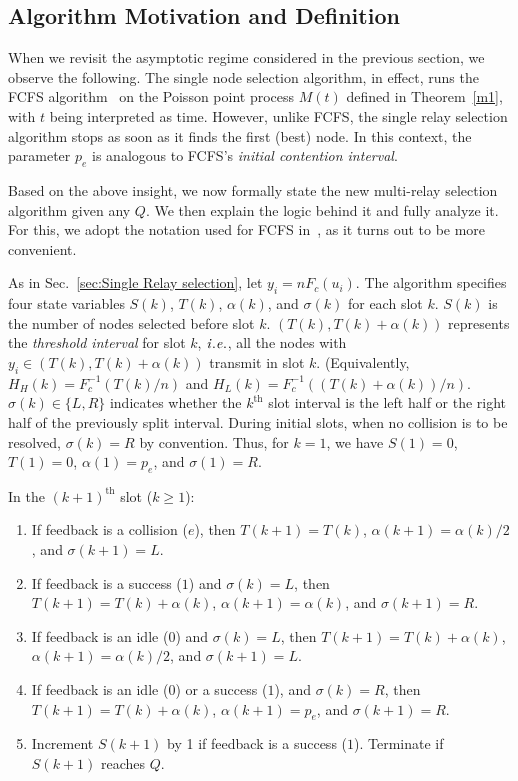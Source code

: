 \documentclass[12pt,draftcls,peerreview, onecolumn]{IEEEtran}
\newcommand{\brac}[1]{\left({#1}\right)}
\newcommand{\kth}{^{{\mathrm{th}}}}
\newcommand{\ie}{{\it i.e.}}
\begin{document}
\subsection{Algorithm Motivation and Definition}
\label{subsec:Q-algo defiition}

When we revisit the asymptotic regime considered in the previous
section, we observe the following.  The single node selection
algorithm, in effect, runs the FCFS
algorithm~\cite{bertsekas_gallager} on the Poisson point process
$M(t)$ defined in Theorem~\ref{m1}, with $t$ being interpreted as
time.  However, unlike FCFS, the single relay selection algorithm
stops as soon as it finds the first (best) node.  In this context, the
parameter $p_e$ is analogous to FCFS's {\em initial contention
  interval}.


Based on the above insight, we now formally state the new multi-relay
selection algorithm given any $Q$. We then explain the logic behind it
and fully analyze it.  For this, we adopt the notation used for FCFS
in~\cite{bertsekas_gallager}, as it turns out to be more convenient.

As in Sec.~\ref{sec:Single Relay selection}, let $y_{i} = n F_c(u_i)$.
The algorithm specifies four state variables $S(k)$, $T(k)$,
$\alpha(k)$, and $\sigma(k)$ for each slot $k$. $S(k)$ is the number
of nodes selected before slot $k$.  $(T(k), T(k)+\alpha(k))$
represents the {\em threshold interval} for slot $k$, $\ie$, all the
nodes with $y_i\in(T(k), T(k)+\alpha(k))$ transmit in slot $k$.
(Equivalently, $H_H(k)=F_c^{-1}\brac{T(k)/n}$ and \mbox{$H_L(k)=
  F_c^{-1}\brac{ \brac{ T(k) + \alpha(k)}/n}$.}
$\sigma(k)\in\{L,R\}$ indicates whether the $k\kth$ slot interval is
the left half or the right half of the previously split interval.
During initial slots, when no collision is to be resolved,
$\sigma(k)=R$ by convention. Thus, for $k = 1$, we have
$S(1) = 0$, $T(1) = 0$, $\alpha(1)=p_e$, and $\sigma(1) = R$.


In the $(k+1)\kth$ slot ($k \geq 1$):
\begin{enumerate}
\item If feedback is a collision ($e$), then $T(k+1) = T(k) $, \mbox{$\alpha(k+1) = \alpha(k)/2$,} and $\sigma(k+1) = L$.

\item If feedback is a success ($1$) and $\sigma(k) = L$, then \mbox{$T(k+1) = T(k) + \alpha(k)$}, $\alpha(k+1) = \alpha(k)$,
and \mbox{$\sigma(k+1) = R$. }

\item If feedback is an idle ($0$) and $\sigma(k) = L$, then \mbox{$T(k+1) = T(k) +\alpha(k)$,} $\alpha(k+1) = \alpha(k)/2$, and $\sigma(k+1) = L$.

\item If feedback is an idle ($0$) or a success ($1$), and $\sigma(k) = R$, then $ T(k+1) = T(k)+\alpha(k)$, $\alpha(k+1) = p_{e}$, and $\sigma(k+1) = R$.

\item Increment $S(k+1)$ by 1 if feedback is a success ($1$). Terminate if $S(k+1)$ reaches $Q$.
\end{enumerate}
\end{document}
